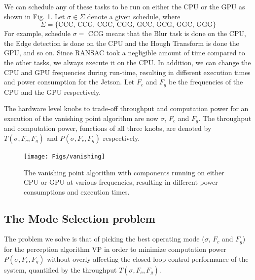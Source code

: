We can schedule any of these tasks to be run on either the CPU or the GPU as shown in Fig. \ref{fig:vanishing}.
Let $\sigma \in \Sigma$ denote a given schedule, where 
\[\Sigma=\{\text{CCC, CCG, CGC, CGG, GCC, GCG, GGC, GGG}\} \]
For example, schedule $\sigma=$ CCG means that the Blur task is done on the CPU, the Edge detection is done on the CPU and the Hough Transform is done the GPU, and so on.
Since RANSAC took a negligible amount of time compared to the other tasks, we always execute it on the CPU.
In addition, we can change the CPU and GPU frequencies during run-time, resulting in different execution times and power consumption for the Jetson. 
Let $F_c$ and $F_g$ be the frequencies of the CPU and the GPU respectively. 

The hardware level knobs to trade-off throughput and computation power for an execution of the vanishing point algorithm are now $\sigma$, $F_c$ and $F_g$. 
The throughput and computation power, functions  of all three knobs, are denoted by $T(\sigma,F_c,F_g)$ and $P(\sigma,F_c,F_g)$ respectively.


\begin{figure}
	\centering
	\texttt{[image: Figs/vanishing]}
	\caption{The vanishing point algorithm with components running on either CPU or GPU at various frequencies, resulting in different power consumptions and execution times.}
	\label{fig:vanishing}		
\end{figure}

\subsection{The Mode Selection problem}
\label{sec:mode selection}
The problem we solve is that of picking the best operating mode ($\sigma$, $F_c$ and $F_g$) for the perception algorithm VP in order to minimize computation power $P(\sigma,F_c,F_g)$ without overly affecting the closed loop control performance of the system, quantified by the throughput $T(\sigma,F_c,F_g)$. 
